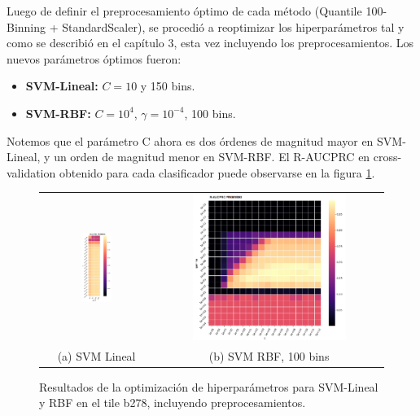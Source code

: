 Luego de definir el preprocesamiento óptimo de cada método (Quantile 100-Binning + StandardScaler), se procedió a reoptimizar los hiperparámetros tal y como se describió en el capítulo 3, esta vez incluyendo los preprocesamientos. Los nuevos parámetros óptimos fueron: 

\begin{itemize}
\item \textbf{SVM-Lineal:} $C=10$ y 150 bins.
\item \textbf{SVM-RBF:} $C=10^4$, $\gamma = 10^{-4}$, 100 bins.
\end{itemize}  

Notemos que el parámetro C ahora es dos órdenes de magnitud mayor en SVM-Lineal, y un orden de magnitud menor en SVM-RBF. El R-AUCPRC en cross-validation obtenido para cada clasificador puede observarse en la figura \ref{fig:reopt_param}. \\

\begin{figure}[h!]
\begin{tabular}{cc}
  \includegraphics[width=0.29\textwidth]{Kap4/reoptl.png} &   \includegraphics[width=0.7\textwidth]{Kap4/reoptk.png} \\
(a) SVM Lineal & (b) SVM RBF, 100 bins
\end{tabular}
\caption{Resultados de la optimización de hiperparámetros para SVM-Lineal y RBF en el tile b278, incluyendo preprocesamientos.}
\label{fig:reopt_param}
\end{figure}


